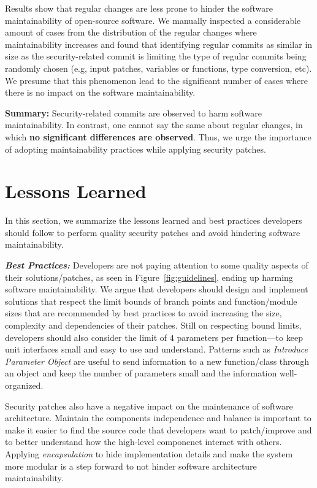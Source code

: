 \documentclass[smallextended]{svjour3}       %
\begin{document}
Results show that regular changes are less prone to hinder the software maintainability of open-source software.   
We manually inspected a considerable amount of cases from
the distribution of the regular changes where maintainability 
increases and found that identifying regular commits as similar in 
size as the security-related commit is limiting the type of regular 
commits being randomly chosen (e.g, input 
patches, variables or functions, type conversion, etc).  
We presume that this phenomenon lead
to the significant number of cases where there is no impact
on the software maintainability.

\textbf{Summary:} Security-related commits are observed to harm software 
maintainability. In contrast, one cannot say the same about
regular changes, in which \textbf{no significant differences are observed}. 
Thus, we urge the importance of adopting maintainability practices while 
applying security patches.

\section{Lessons Learned}\label{sec:lessons}

In this section, we summarize the lessons learned and 
best practices developers should follow to perform 
quality security patches and avoid hindering 
software maintainability.

\textit{\textbf{Best Practices:}} Developers are not 
paying attention to some quality aspects of their solutions/patches, 
as seen in Figure~\ref{fig:guidelines}, ending up harming 
software maintainability. We argue that developers
should design and implement solutions that respect the 
limit bounds of branch points and function/module sizes that are 
recommended by best practices to avoid increasing the 
size, complexity and dependencies of their patches.
Still on respecting bound limits, developers 
should also consider the limit of $4$ parameters per function---to 
keep unit interfaces small and easy to use and understand.
Patterns such as \emph{Introduce Parameter Object} are useful 
to send information to a new function/class through an object
and keep the number of parameters small and the information well-organized.

Security patches also have a negative impact on the maintenance of 
software architecture. Maintain the components independence and balance 
is important to make it easier to find the source code that 
developers want to patch/improve and to better understand
how the high-level componenet interact with others. Applying 
\emph{encapsulation} to hide implementation details and make the system 
more modular is a step forward to not hinder software architecture maintainability.
\end{document}

